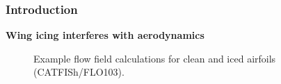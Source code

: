 \documentclass[9pt]{beamer}
\begin{document}
\begin{frame}
\frametitle{Introduction}
\label{sec-1-3}

\textbf{Wing icing interferes with aerodynamics}
\begin{figure}
   \caption{Example flow field calculations for clean and iced airfoils (CATFISh/FLO103).}
\end{figure}
\end{frame}
\end{document}
